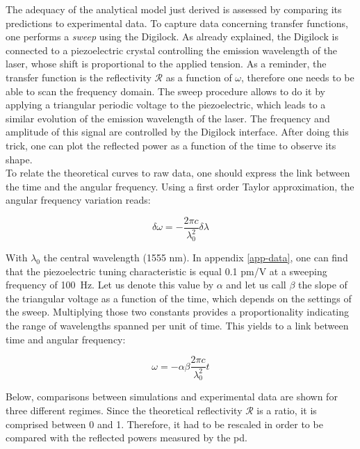 The adequacy of the analytical model just derived is assessed by comparing its predictions to experimental data. To capture data concerning transfer functions, one performs a \textit{sweep} using the Digilock. As already explained, the Digilock is connected to a piezoelectric crystal controlling the emission wavelength of the laser, whose shift is proportional to the applied tension. As a reminder, the transfer function is the reflectivity $\mathcal{R}$ as a function of $\omega$, therefore one needs to be able to scan the frequency domain. The sweep procedure allows to do it by applying a triangular periodic voltage to the piezoelectric, which leads to a similar evolution of the emission wavelength of the laser. The frequency and amplitude of this signal are controlled by the Digilock interface. After doing this trick, one can plot the reflected power as a function of the time to observe its shape.\\

To relate the theoretical curves to raw data, one should express the link between the time and the angular frequency. Using a first order Taylor approximation, the angular frequency variation reads:

\begin{equation}
	\delta \omega = -\frac{2\pi c}{\lambda_0^2} \delta \lambda
\end{equation}

With $\lambda_0$ the central wavelength (1555 nm). In appendix \ref{app-data}, one can find that the piezoelectric tuning characteristic is equal 0.1 pm/V at a sweeping frequency of \SI{100}{\Hz}. Let us denote this value by $\alpha$ and let us call $\beta$ the slope of the triangular voltage as a function of the time, which depends on the settings of the sweep. Multiplying those two constants provides a proportionality indicating the range of wavelengths spanned per unit of time. This yields to a link between time and angular frequency:

\begin{equation}
	\omega = - \alpha \beta \frac{2 \pi c}{\lambda_0^2} t
	\label{eq-omega-vs-t}
\end{equation}

Below, comparisons between simulations and experimental data are shown for three different regimes. Since the theoretical reflectivity $\mathcal{R}$ is a ratio, it is comprised between 0 and 1. Therefore, it had to be rescaled in order to be compared with the reflected powers measured by the \gls{pd}.

